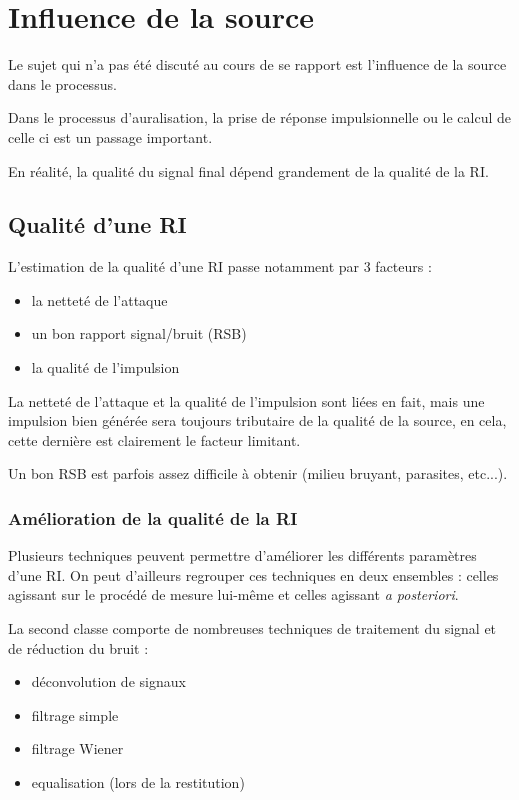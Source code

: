 \chapter{Influence de la source}

Le sujet qui n'a pas été discuté au cours de se rapport est l'influence de la source dans le processus.

Dans le processus d'auralisation, la prise de réponse impulsionnelle ou le calcul de celle ci est un passage important.

En réalité, la qualité du signal final dépend grandement de la qualité de la RI.

\section{Qualité d'une RI} %

L'estimation de la qualité d'une RI passe notamment par 3 facteurs :

\begin{itemize}
	\item la netteté de l'attaque
	\item un bon rapport signal/bruit (RSB)
	\item la qualité de l'impulsion
\end{itemize}

La netteté de l'attaque et la qualité de l'impulsion sont liées en fait, mais une impulsion bien générée sera toujours
tributaire de la qualité de la source, en cela, cette dernière est clairement le facteur limitant.

Un bon RSB est parfois assez difficile à obtenir (milieu bruyant, parasites, etc...).

\subsection{Amélioration de la qualité de la RI} %

Plusieurs techniques peuvent permettre d'améliorer les différents paramètres d'une RI. On peut d'ailleurs regrouper ces
techniques en deux ensembles : celles agissant sur le procédé de mesure lui-même et celles agissant \textit{a
posteriori}. 

La second classe comporte de nombreuses techniques de traitement du signal et de réduction du bruit :

\begin{itemize}
    \item déconvolution de signaux
    \item filtrage simple
    \item filtrage Wiener
    \item equalisation (lors de la restitution)
\end{itemize}

